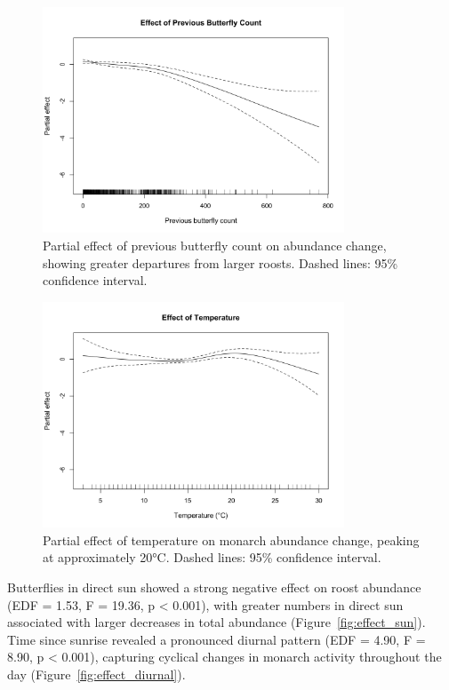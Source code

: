 \begin{figure}[htbp]
\centering
\includegraphics[width=0.8\textwidth]{supplemental/results/thesis_exports/figures/effect_previous_butterfly_count.png}
\caption{Partial effect of previous butterfly count on abundance change, showing greater departures from larger roosts. Dashed lines: 95\% confidence interval.}\label{fig:effect_roost_size}
\end{figure}

\begin{figure}[htbp]
\centering
\includegraphics[width=0.8\textwidth]{supplemental/results/thesis_exports/figures/effect_temperature.png}
\caption{Partial effect of temperature on monarch abundance change, peaking at approximately 20°C. Dashed lines: 95\% confidence interval.}\label{fig:effect_temperature}
\end{figure}

Butterflies in direct sun showed a strong negative effect on roost abundance (EDF = 1.53, F = 19.36, p < 0.001), with greater numbers in direct sun associated with larger decreases in total abundance (Figure~\ref{fig:effect_sun}). Time since sunrise revealed a pronounced diurnal pattern (EDF = 4.90, F = 8.90, p < 0.001), capturing cyclical changes in monarch activity throughout the day (Figure~\ref{fig:effect_diurnal}).

